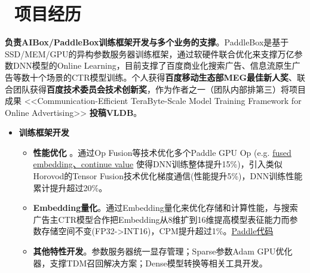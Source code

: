 \documentclass{resume}
\begin{document}
\section{\faUsers\ 项目经历}
\begin{onehalfspacing}
\textbf{负责AIBox/PaddleBox训练框架开发与多个业务的支撑}。PaddleBox是基于SSD/MEM/GPU的异构参数服务器训练框架，通过软硬件联合优化来支撑万亿参数DNN模型的Online Learning，目前支撑了百度商业化搜索广告、信息流原生广告等数十个场景的CTR模型训练。个人获得\textbf{百度移动生态部MEG最佳新人奖}、联合团队获得\textbf{百度技术委员会技术创新奖}，作为作者之一（团队内部排第三）将项目成果 <<Communication-Efficient TeraByte-Scale Model Training Framework for Online Advertising>> \textbf{投稿VLDB}。
\begin{itemize}%
\item \textbf{训练框架开发}

\begin{itemize}
\item \textbf{性能优化} 。通过Op Fusion等技术优化多个Paddle GPU Op (e.g. \href{https://github.com/neuzxy/Paddle/commit/5e6f8bf1f38622571d868e35bb99ccb924856aee}{fused embedding、continue value} 使得DNN训练整体提升15\%)，引入类似Horovod的Tensor Fusion技术优化梯度通信(性能提升5\%)，DNN训练性能累计提升超过20\%。
\item \textbf{Embedding量化}。通过Embedding量化来优化存储和计算性能，与搜索广告主CTR模型合作把Embedding从8维扩到16维提高模型表征能力而参数存储空间不变(FP32->INT16)，CPM提升超过1\%。\href{https://github.com/neuzxy/Paddle/commit/1c5c0591ec3402c31eaa32a31c62e9fc518a11f2}{Paddle代码}
\item \textbf{其他特性开发}。参数服务器统一显存管理；Sparse参数Adam GPU优化器，支撑TDM召回解决方案；Dense模型转换等相关工具开发。
\end{itemize}


\end{itemize}
\end{onehalfspacing}
\end{document}
